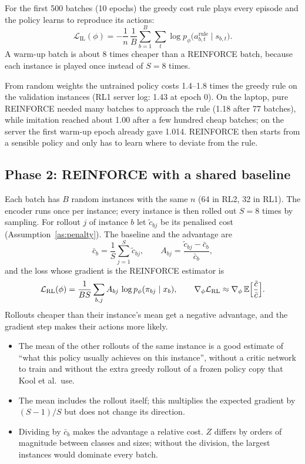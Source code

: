 For the first 500 batches (10 epochs) the greedy cost rule plays every episode and the policy learns to reproduce its actions:
\[
\mathcal L_{\text{IL}}(\phi)=-\frac1n\,\frac1B\sum_{b=1}^{B}\sum_{t}\log p_\phi\big(a^{\text{rule}}_{b,t}\mid s_{b,t}\big).
\]
A warm-up batch is about 8 times cheaper than a REINFORCE batch, because each instance is played once instead of $S=8$ times.

\begin{whybox}[title=Why a warm-up]
From random weights the untrained policy costs 1.4--1.8 times the greedy rule on the validation instances (RL1 server log: 1.43 at epoch 0). On the laptop, pure REINFORCE needed many batches to approach the rule (1.18 after 77 batches), while imitation reached about 1.00 after a few hundred cheap batches; on the server the first warm-up epoch already gave 1.014. REINFORCE then starts from a sensible policy and only has to learn where to deviate from the rule.
\end{whybox}

\subsection{Phase 2: REINFORCE with a shared baseline}

Each batch has $B$ random instances with the same $n$ (64 in RL2, 32 in RL1). The encoder runs once per instance; every instance is then rolled out $S=8$ times by sampling. For rollout $j$ of instance $b$ let $\tilde c_{bj}$ be its penalised cost (Assumption~\ref{as:penalty}). The baseline and the advantage are
\[
\bar c_b=\frac1S\sum_{j=1}^{S}\tilde c_{bj},\qquad A_{bj}=\frac{\tilde c_{bj}-\bar c_b}{\bar c_b},
\]
and the loss whose gradient is the REINFORCE estimator is
\[
\mathcal L_{\text{RL}}(\phi)=\frac{1}{BS}\sum_{b,j}A_{bj}\,\log p_\phi(\pi_{bj}\mid x_b),\qquad
\nabla_\phi\mathcal L_{\text{RL}}\approx\nabla_\phi\,\mathbb{E}\Big[\frac{\tilde c}{\bar c}\Big].
\]
Rollouts cheaper than their instance's mean get a negative advantage, and the gradient step makes their actions more likely.

\begin{whybox}[title=Why this baseline and this normalisation]
\begin{itemize}
  \item The mean of the other rollouts of the same instance is a good estimate of ``what this policy usually achieves on this instance'', without a critic network to train and without the extra greedy rollout of a frozen policy copy that Kool et al.\ use.
  \item The mean includes the rollout itself; this multiplies the expected gradient by $(S-1)/S$ but does not change its direction.
  \item Dividing by $\bar c_b$ makes the advantage a relative cost. $Z$ differs by orders of magnitude between classes and sizes; without the division, the largest instances would dominate every batch.
\end{itemize}
\end{whybox}

